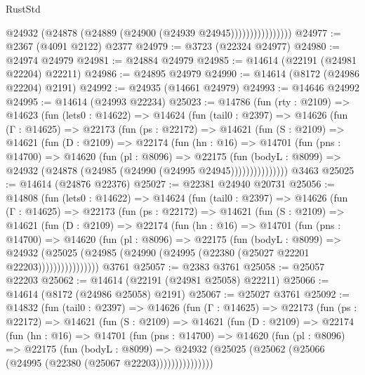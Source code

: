 \begin{lexlean}{RustStd}
\begin{coremodule}
                          @24932 (@24878 (@24889 (@24900 (@24939 @24945))))))))))))))))
@24977 := @2367 (@4091 @2122) @2377
@24979 := @3723 (@22324 @24977)
@24980 := @24974 @24979
@24981 := @24884 @24979
@24985 := @14614 (@22191 (@24981 @22204) @22211)
@24986 := @24895 @24979
@24990 := @14614 (@8172 (@24986 @22204) @2191)
@24992 := @24935 (@14661 @24979)
@24993 := @14646 @24992
@24995 := @14614 (@24993 @22234)
@25023 := @14786
    (fun (rty : @2109) =>
    @14623
      (fun (lets0 : @14622) =>
      @14624
        (fun (tail0 : @2397) =>
        @14626
          (fun (Γ : @14625) =>
          @22173
            (fun (ps : @22172) =>
            @14621
              (fun (S : @2109) =>
              @14621
                (fun (D : @2109) =>
                @22174
                  (fun (hn : @16) =>
                  @14701
                    (fun (pns : @14700) =>
                    @14620
                      (fun (pl : @8096) =>
                      @22175
                        (fun (bodyL : @8099) =>
                        @24932 (@24878 (@24985 (@24990 (@24995 @24945)))))))))))))))
    @3463
@25025 := @14614 (@24876 @22376)
@25027 := @22381 @24940 @20731
@25056 := @14808
    (fun (lets0 : @14622) =>
    @14624
      (fun (tail0 : @2397) =>
      @14626
        (fun (Γ : @14625) =>
        @22173
          (fun (ps : @22172) =>
          @14621
            (fun (S : @2109) =>
            @14621
              (fun (D : @2109) =>
              @22174
                (fun (hn : @16) =>
                @14701
                  (fun (pns : @14700) =>
                  @14620
                    (fun (pl : @8096) =>
                    @22175
                      (fun (bodyL : @8099) =>
                      @24932
                        (@25025
                          (@24985 (@24990 (@24995 (@22380 (@25027 @22201 @22203))))))))))))))))
    @3761
@25057 := @2383 @3761
@25058 := @25057 @22203
@25062 := @14614 (@22191 (@24981 @25058) @22211)
@25066 := @14614 (@8172 (@24986 @25058) @2191)
@25067 := @25027 @3761
@25092 := @14832
    (fun (tail0 : @2397) =>
    @14626
      (fun (Γ : @14625) =>
      @22173
        (fun (ps : @22172) =>
        @14621
          (fun (S : @2109) =>
          @14621
            (fun (D : @2109) =>
            @22174
              (fun (hn : @16) =>
              @14701
                (fun (pns : @14700) =>
                @14620
                  (fun (pl : @8096) =>
                  @22175
                    (fun (bodyL : @8099) =>
                    @24932 (@25025 (@25062 (@25066 (@24995 (@22380 (@25067 @22203)))))))))))))))

\end{coremodule}
\end{lexlean}
